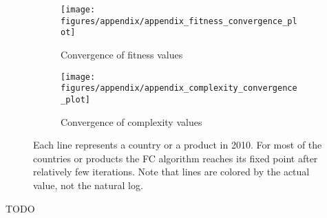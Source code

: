 \documentclass[11pt]{article}
\begin{document}
\begin{appendices}
\begin{figure}
     \centering
     \begin{subfigure}[b]{0.45\textwidth}
         \centering
         \texttt{[image: figures/appendix/appendix\_fitness\_convergence\_plot]}
	 \caption{Convergence of fitness values}
         \label{fig:fit_conv}
     \end{subfigure}
     \hfill
     \begin{subfigure}[b]{0.45\textwidth}
         \centering
         \texttt{[image: figures/appendix/appendix\_complexity\_convergence\_plot]}
         \caption{Convergence of complexity values}
         \label{fig:comp_conv}
     \end{subfigure}
     \caption{Each line represents a country or a product in 2010. For most of the countries or products the FC algorithm reaches its fixed point after relatively few iterations. Note that lines are colored by the actual value, not the natural log.}
        \label{fig:fc_conv}
\end{figure}


TODO
\end{appendices}

\newpage
\end{document}
